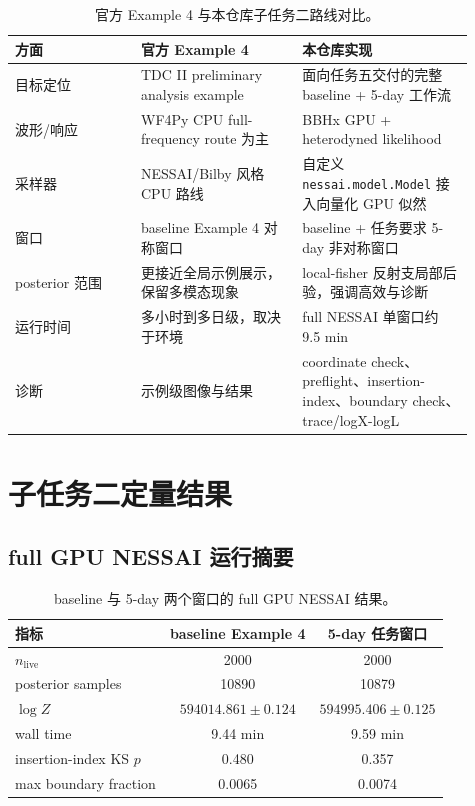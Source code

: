 \documentclass[11pt,a4paper]{ctexart}
\begin{document}
\begin{table}[H]
\centering
\caption{官方 Example 4 与本仓库子任务二路线对比。}
\begin{tabular}{p{0.25\linewidth}p{0.32\linewidth}p{0.34\linewidth}}
\toprule
方面 & 官方 Example 4 & 本仓库实现 \\
\midrule
目标定位 & TDC II preliminary analysis example & 面向任务五交付的完整 baseline + 5-day 工作流 \\
波形/响应 & WF4Py CPU full-frequency route 为主 & BBHx GPU + heterodyned likelihood \\
采样器 & NESSAI/Bilby 风格 CPU 路线 & 自定义 \texttt{nessai.model.Model} 接入向量化 GPU 似然 \\
窗口 & baseline Example 4 对称窗口 & baseline + 任务要求 5-day 非对称窗口 \\
posterior 范围 & 更接近全局示例展示，保留多模态现象 & local-fisher 反射支局部后验，强调高效与诊断 \\
运行时间 & 多小时到多日级，取决于环境 & full NESSAI 单窗口约 9.5 min \\
诊断 & 示例级图像与结果 & coordinate check、preflight、insertion-index、boundary check、trace/logX-logL \\
\bottomrule
\end{tabular}
\end{table}

\section{子任务二定量结果}

\subsection{full GPU NESSAI 运行摘要}

\begin{table}[H]
\centering
\caption{baseline 与 5-day 两个窗口的 full GPU NESSAI 结果。}
\begin{tabular}{lcc}
\toprule
指标 & baseline Example 4 & 5-day 任务窗口 \\
\midrule
\(n_\mathrm{live}\) & 2000 & 2000 \\
posterior samples & 10890 & 10879 \\
\(\log Z\) & \(594014.861 \pm 0.124\) & \(594995.406 \pm 0.125\) \\
wall time & 9.44 min & 9.59 min \\
insertion-index KS \(p\) & 0.480 & 0.357 \\
max boundary fraction & 0.0065 & 0.0074 \\
\bottomrule
\end{tabular}
\end{table}
\end{document}
